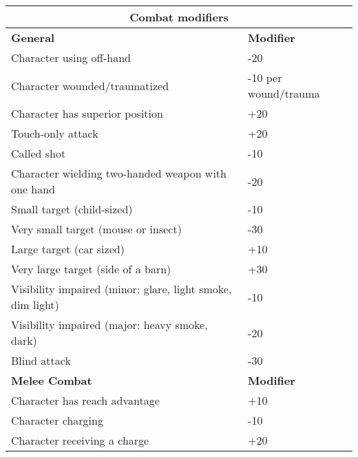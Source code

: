 \begin{table} \begin{tabularx}{\textwidth}{|X|l|} \hline

\multicolumn{2}{|c|}{\textbf{Combat modifiers}}	\\ \hline

\textbf{General} &\textbf{Modifier}	\\ \hline

Character using off-hand	&-20	\\ \hline

Character wounded/traumatized	&-10 per wound/trauma	\\ \hline

Character has superior position	&+20	\\ \hline

Touch-only attack	&+20	\\ \hline

Called shot	&-10	\\ \hline

Character wielding two-handed weapon with one hand &-20	\\ \hline

Small target (child-sized)	&-10	\\ \hline

Very small target (mouse or insect)	&-30	\\ \hline

Large target (car sized) &+10	\\ \hline

Very large target (side of a barn) &+30	\\ \hline

Visibility impaired (minor: glare, light smoke, dim light) &-10	\\ \hline

Visibility impaired (major: heavy smoke, dark) &-20	\\ \hline

Blind attack &-30	\\ \hline

\textbf{Melee Combat} &\textbf{Modifier}	\\ \hline

Character has reach advantage &+10	\\ \hline

Character charging &-10	\\ \hline

Character receiving a charge &+20	\\ \hline


\end{tabularx}
\end{table}
